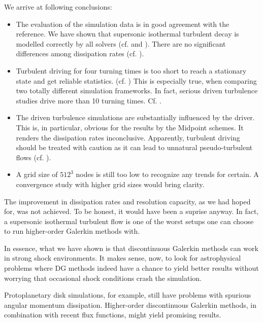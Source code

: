 We arrive at following conclusions:
\begin{itemize}
\item The evaluation of the simulation data is in good agreement with the
reference. We have shown that supersonic isothermal turbulent decay is modelled
correctly by all solvers (cf.  and
). There are no significant differences among dissipation
rates (cf. ).

\item Turbulent driving for four turning times is too short to reach a
stationary state and get reliable statistics. (cf.
) This is especially true, when
comparing two totally different simulation frameworks. In fact, serious driven
turbulence studies drive more than 10 turning times. Cf. \cite{konstandin2016mach}.

\item The driven turbulence simulations are substantially influenced by the
driver. This is, in particular, obvious for the results by the Midpoint
schemes. It renders the dissipation rates inconclusive. Apparently, turbulent
driving should be treated with caution as it can lead to unnatural
pseudo-turbulent flows (cf. ).

\item A grid size of $512^3$ nodes is still too low to recognize any trends for
certain. A convergence study with higher grid sizes would bring clarity.
\end{itemize}

The improvement in dissipation rates and resolution capacity, as we had hoped
for, was not achieved. To be honest, it would have been a suprise anyway. In
fact, a supersonic isothermal turbulent flow is one of the worst setups one can
choose to run higher-order Galerkin methods with. 


In essence, what we have shown is that discontinuous Galerkin methods can work
in strong shock environments. It makes sense, now, to look for astrophysical
problems where DG methods indeed have a chance to yield better results
without worrying that occasional shock conditions crash the simulation.

Protoplanetary disk simulations, for example, still have problems with
spurious angular momentum dissipation. Higher-order discontinuous
Galerkin methods, in combination with recent flux functions, might yield
promising results.

\newpage
